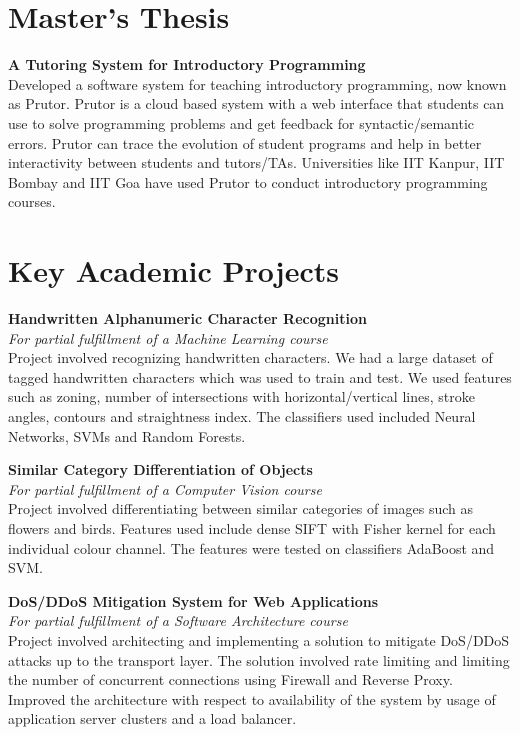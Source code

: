 \documentclass[margin,line]{res}
\begin{document}
\begin{resume}
\section{\sc Master's Thesis}
{\bf A Tutoring System for Introductory Programming} \\
Developed a software system for teaching introductory programming, now known as Prutor. Prutor is a cloud based system with a web interface that students can use to solve programming problems and get feedback for syntactic/semantic errors. Prutor can trace the evolution of student programs and help in better interactivity between students and tutors/TAs. Universities like IIT Kanpur, IIT Bombay and IIT Goa have used Prutor to conduct introductory programming courses.

\section{\sc Key Academic Projects}

{\bf Handwritten Alphanumeric Character Recognition} \\
{\em For partial fulfillment of a Machine Learning course} \\
Project involved recognizing handwritten characters. We had a large dataset of tagged handwritten characters which was used to train and test. We used features such as zoning, number of intersections with horizontal/vertical lines, stroke angles, contours and straightness index. The classifiers used included Neural Networks, SVMs and Random Forests.

{\bf Similar Category Differentiation of Objects} \\
{\em For partial fulfillment of a Computer Vision course} \\
Project involved differentiating between similar categories of images such as flowers and birds. Features used include dense SIFT with Fisher kernel for each individual colour channel. The features were tested on classifiers AdaBoost and SVM.

{\bf DoS/DDoS Mitigation System for Web Applications} \\
{\em For partial fulfillment of a Software Architecture course} \\
Project involved architecting and implementing a solution to mitigate DoS/DDoS attacks up to the transport layer. The solution involved rate limiting and limiting the number of concurrent connections using Firewall and Reverse Proxy. Improved the architecture with respect to  availability of the system by usage of application server clusters and a load balancer.


\end{resume}
\end{document}
